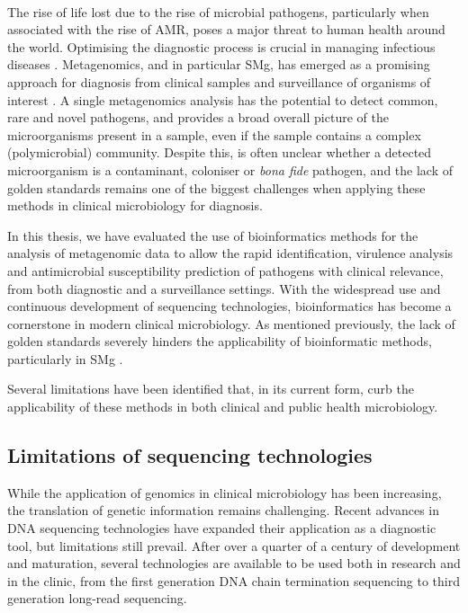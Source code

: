 \mbox{}\\
\vspace{8cm}

The rise of life lost due to the rise of microbial pathogens, particularly when associated with the rise of \ac{AMR}, poses a major threat to human health around the world. Optimising the diagnostic process is crucial in managing infectious diseases \citep{vos_global_2020}. Metagenomics, and in particular \ac{SMg}, has emerged as a promising approach for diagnosis from clinical samples and surveillance of organisms of interest \citep{loman_culture-independent_2013, rossen__2018, schuele_future_2021, chiu_clinical_2019}. A single metagenomics analysis has the potential to detect common, rare and novel pathogens, and provides a broad overall picture of the microorganisms present in a sample, even if the sample contains a complex (polymicrobial) community. Despite this, is often unclear whether a detected microorganism is a contaminant, coloniser or \textit{bona fide} pathogen, and the lack of golden standards remains one of the biggest challenges when applying these methods in clinical microbiology for diagnosis.

In this thesis, we have evaluated the use of bioinformatics methods for the analysis of metagenomic data to allow the rapid identification, virulence analysis and antimicrobial susceptibility prediction of pathogens with clinical relevance, from both diagnostic and a surveillance settings. With the widespread use and continuous development of sequencing technologies, bioinformatics has become a cornerstone in modern clinical microbiology. As mentioned previously, the lack of golden standards severely hinders the applicability of bioinformatic methods, particularly in \ac{SMg} \citep{carrico_primer_2018, couto_critical_2018, angers-loustau_challenges_2018, gruening_recommendations_2019, sczyrba_critical_2017}. 

Several limitations have been identified that, in its current form, curb the applicability of these methods in both clinical and public health microbiology. 

\subsection{Limitations of sequencing technologies}

While the application of genomics in clinical microbiology has been increasing, the translation of genetic information remains challenging. Recent advances in DNA sequencing technologies have expanded their application as a diagnostic tool, but limitations still prevail. After over a quarter of a century of development and maturation, several technologies are available to be used both in research and in the clinic, from the first generation DNA chain termination sequencing to third generation long-read sequencing. 

